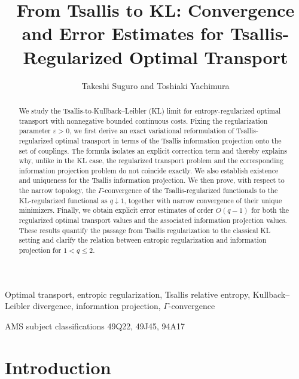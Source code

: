 \documentclass[a4paper,11pt]{article}
\title{\bf From Tsallis to KL: Convergence and Error Estimates for Tsallis-Regularized Optimal Transport}
\author{Takeshi Suguro and Toshiaki Yachimura}
\date{}
\makeatletter
\newenvironment{@abssec}[1]{%
    \if@twocolumn

    \section*{#1}%
    \else

      \vspace{.05in}\footnotesize
      \parindent .2in
 {\upshape\bfseries #1. }\ignorespaces
    \fi}
\newenvironment{keywords}{\begin{@abssec}{\keywordsname}}{\end{@abssec}}
\newenvironment{AMS}{\begin{@abssec}{\AMSname}}{\end{@abssec}}
\newcommand\keywordsname{Keywords}
\newcommand\AMSname{AMS subject classifications}
\theoremstyle{plain}
\theoremstyle{definition}
\theoremstyle{remark}
\theoremstyle{plain}
\numberwithin{equation}{section}
\newcommand{\1}{\mbox{1}\hspace{-0.25em}\mbox{l}} %
\makeatother
\begin{document}
\maketitle

\begin{abstract}
We study the Tsallis-to-Kullback--Leibler (KL) limit for entropy-regularized optimal transport with nonnegative bounded continuous costs. Fixing the regularization parameter $\varepsilon > 0$, we first derive an exact variational reformulation of Tsallis-regularized optimal transport in terms of the Tsallis information projection onto the set of couplings. The formula isolates an explicit correction term and thereby explains why, unlike in the KL case, the regularized transport problem and the corresponding information projection problem do not coincide exactly. We also establish existence and uniqueness for the Tsallis information projection. We then prove, with respect to the narrow topology, the $\Gamma$-convergence of the Tsallis-regularized functionals to the KL-regularized functional as $q\downarrow1$, together with narrow convergence of their unique minimizers. Finally, we obtain explicit error estimates of order $O(q-1)$ for both the regularized optimal transport values and the associated information projection values. These results quantify the passage from Tsallis regularization to the classical KL setting and clarify the relation between entropic regularization and information projection for $1 < q \leq 2$.
\end{abstract}

\begin{keywords}
Optimal transport, entropic regularization, Tsallis relative entropy, Kullback--Leibler divergence, information projection, $\Gamma$-convergence
\end{keywords}

\begin{AMS}
49Q22, 49J45, 94A17
\end{AMS}

\pagestyle{plain}
\thispagestyle{plain}

\section{Introduction}\label{intro}
\end{document}
